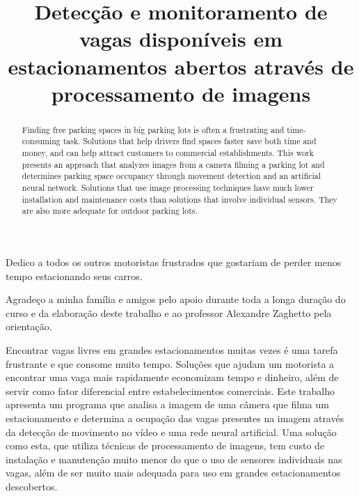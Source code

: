 \documentclass[bacharelado]{unb-cic}
\title{Detecção e monitoramento de vagas disponíveis em estacionamentos abertos através de processamento de imagens}
\begin{document}
  \maketitle
  \pretextual

  \begin{dedicatoria}
  Dedico a todos os outros motoristas frustrados que gostariam de perder menos tempo estacionando seus carros.
  \end{dedicatoria}

  \begin{agradecimentos}
  Agradeço a minha família e amigos pelo apoio durante toda a longa duração do curso e da elaboração deste trabalho e ao professor Alexandre Zaghetto pela orientação.
  \end{agradecimentos}

  \begin{resumo}
  Encontrar vagas livres em grandes estacionamentos muitas vezes é uma tarefa frustrante e que consome muito tempo. Soluções que ajudam um motorista a encontrar uma vaga mais rapidamente economizam tempo e dinheiro, além de servir como fator diferencial entre estabelecimentos comerciais. Este trabalho apresenta um programa que analisa a imagem de uma câmera que filma um estacionamento e determina a ocupação das vagas presentes na imagem através da detecção de movimento no vídeo e uma rede neural artificial. Uma solução como esta, que utiliza técnicas de processamento de imagens, tem custo de instalação e manutenção muito menor do que o uso de sensores individuais nas vagas, além de ser muito mais adequada para uso em grandes estacionamentos descobertos.
  \end{resumo}

  \begin{abstract}
  Finding free parking spaces in big parking lots is often a frustrating and time-consuming task. Solutions that help drivers find spaces faster save both time and money, and can help attract customers to commercial establishments. This work presents an approach that analyzes images from a camera filming a parking lot and determines parking space occupancy through movement detection and an artificial neural network. Solutions that use image processing techniques have much lower installation and maintenance costs than solutions that involve individual sensors. They are also more adequate for outdoor parking lots.
  \end{abstract}

  \tableofcontents
  \listoffigures
  \listoftables

  \textual
  
	
	
	
	
	
	
  

  \postextual
  
  
\end{document}
